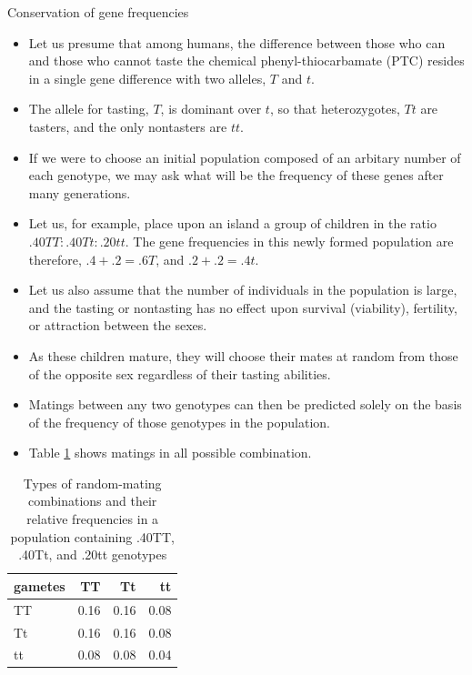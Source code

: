 \documentclass[11pt,dvipsnames,ignorenonframetext,aspectratio=169]{beamer}
\providecommand{\tightlist}{%
  \setlength{\itemsep}{0pt}\setlength{\parskip}{0pt}}
\begin{document}
\begin{frame}{Conservation of gene frequencies}
\protect\hypertarget{conservation-of-gene-frequencies}{}
\small

\begin{itemize}
\tightlist
\item
  Let us presume that among humans, the difference between those who can
  and those who cannot taste the chemical phenyl-thiocarbamate (PTC)
  resides in a single gene difference with two alleles, \(T\) and \(t\).
\item
  The allele for tasting, \(T\), is dominant over \(t\), so that
  heterozygotes, \(Tt\) are tasters, and the only nontasters are \(tt\).
\item
  If we were to choose an initial population composed of an arbitary
  number of each genotype, we may ask what will be the frequency of
  these genes after many generations.
\item
  Let us, for example, place upon an island a group of children in the
  ratio \(.40TT:.40Tt:.20tt\). The gene frequencies in this newly formed
  population are therefore, \(.4 + .2 = .6 T\), and \(.2 + .2 = .4t\).
\item
  Let us also assume that the number of individuals in the population is
  large, and the tasting or nontasting has no effect upon survival
  (viability), fertility, or attraction between the sexes.
\end{itemize}
\end{frame}

\begin{frame}{}
\protect\hypertarget{section-16}{}
\begin{itemize}
\tightlist
\item
  As these children mature, they will choose their mates at random from
  those of the opposite sex regardless of their tasting abilities.
\item
  Matings between any two genotypes can then be predicted solely on the
  basis of the frequency of those genotypes in the population.
\item
  Table \ref{tab:random-mating-monogene-gene-freq} shows matings in all
  possible combination.
\end{itemize}

\begin{table}

\caption{\label{tab:random-mating-monogene-gene-freq}Types of random-mating combinations and their relative frequencies in a population containing .40TT, .40Tt, and .20tt genotypes}
\centering
\fontsize{8}{10}\selectfont
\begin{tabular}[t]{lrrr}
\toprule
gametes & TT & Tt & tt\\
\midrule
TT & 0.16 & 0.16 & 0.08\\
Tt & 0.16 & 0.16 & 0.08\\
tt & 0.08 & 0.08 & 0.04\\
\bottomrule
\end{tabular}
\end{table}
\end{frame}
\end{document}
